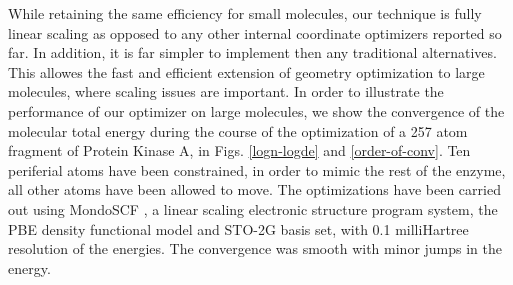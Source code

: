 \documentclass[prl,aps,twocolumn,showpacs,twocolumngrid,superbib]{revtex4}
\begin{document}
While retaining the same efficiency for small molecules, our technique
is fully linear scaling as opposed to any other internal 
coordinate optimizers reported so far. In addition, it is far simpler
to implement then any traditional alternatives.
This allowes the fast and efficient 
extension of geometry optimization 
to large molecules, where scaling issues are important.
In order to illustrate the performance of our optimizer on large
molecules, we show the convergence of the molecular total energy
during the course of the optimization of a 257 atom
fragment of Protein Kinase A, in Figs. \ref{logn-logde} 
and \ref{order-of-conv}. Ten periferial atoms have been 
constrained, in order to mimic the rest of the enzyme, 
all other atoms have been allowed to move.
The optimizations have been carried out 
using MondoSCF \cite{MondoSCF}, a linear scaling electronic structure
program system, the PBE density functional model and 
STO-2G basis set, with 0.1 milliHartree resolution of the energies.
The convergence was smooth with minor jumps in the energy.
\end{document}
